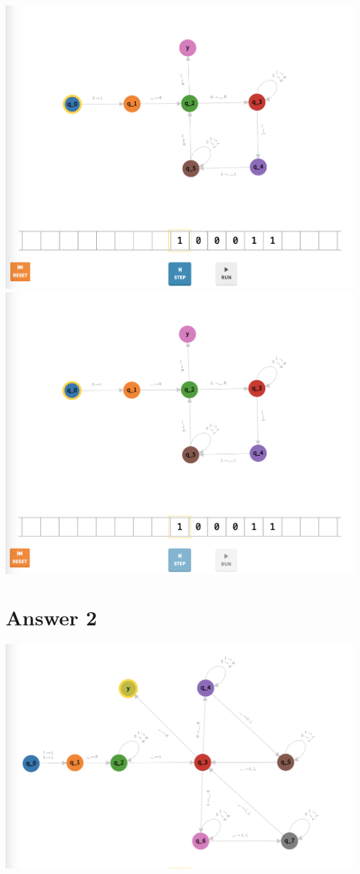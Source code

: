 \documentclass[a4paper]{article}
\begin{document}
\begin{center}
\includegraphics[width=\textwidth]{TM1.13}
\includegraphics[width=\textwidth]{TM1.14}
\end{center}

\newpage

\section*{Answer 2}

\includegraphics[width=\textwidth]{TM2.1}
\end{document}
